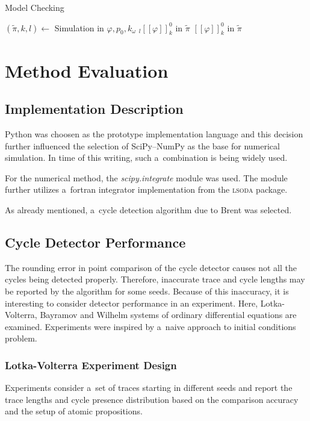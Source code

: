 \documentclass[12pt,twoside,draft]{fithesis}
\begin{document}
\begin{algorithm}
	\caption{Model Checking}
	\label{modelChecking}
	\begin{algorithmic}[1]
		\STATE $(\tilde{\pi},k,l)\leftarrow$ Simulation in $\varphi, p_0, k_\omega$
			\RETURN ${}_l[[\varphi]]_k^0$ in $\tilde{\pi}$ 
		\ELSE
			\RETURN $[[\varphi]]_k^0$ in $\tilde{\pi}$ 
		\ENDIF
	\end{algorithmic}
\end{algorithm}

\chapter{Method Evaluation}
\section{Implementation Description}
Python was choosen as the prototype implementation language and this
decision further influenced the selection of SciPy--NumPy as the base
for numerical simulation. In time of this writing, such a~combination
is being widely used\cite{wiki:python}.

For the numerical method, the \emph{scipy.integrate} module was used.
The module further utilizes a~fortran integrator implementation from
the \textsc{lsoda} package\cite{scipy:odeint}. 

As already mentioned, a~cycle detection algorithm due to Brent was
selected.

\section{Cycle Detector Performance}
The rounding error in point comparison of the cycle detector causes
not all the cycles being detected properly. Therefore, inaccurate trace
and cycle lengths may be reported by the algorithm for some seeds.
Because of this inaccuracy, it is interesting to consider detector
performance in an experiment. Here, Lotka-Volterra, Bayramov and Wilhelm
systems of ordinary differential equations are examined. Experiments
were inspired by a~naive approach to initial conditions
problem\cite{sven}.

\subsection*{Lotka-Volterra Experiment Design}
Experiments consider a~set of traces starting in different seeds
and report the trace lengths and cycle presence distribution based
on the comparison accuracy and the setup of atomic propositions.
\end{document}
